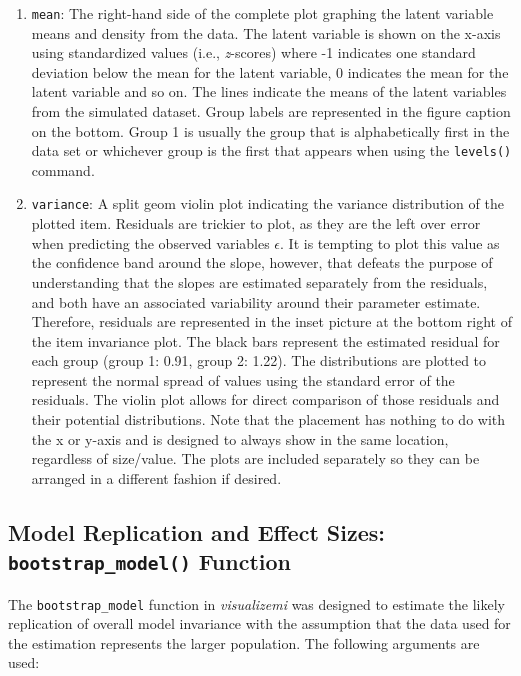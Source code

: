 \documentclass[
  man,floatsintext]{apa7}
\begin{document}
\begin{enumerate}
\def\labelenumi{\arabic{enumi})}
\setcounter{enumi}{2}
\item
  \texttt{mean}: The right-hand side of the complete plot graphing the latent variable means and density from the data. The latent variable is shown on the x-axis using standardized values (i.e., \emph{z}-scores) where -1 indicates one standard deviation below the mean for the latent variable, 0 indicates the mean for the latent variable and so on. The lines indicate the means of the latent variables from the simulated dataset. Group labels are represented in the figure caption on the bottom. Group 1 is usually the group that is alphabetically first in the data set or whichever group is the first that appears when using the \texttt{levels()} command.
\item
  \texttt{variance}: A split geom violin plot indicating the variance distribution of the plotted item. Residuals are trickier to plot, as they are the left over error when predicting the observed variables \(\epsilon\). It is tempting to plot this value as the confidence band around the slope, however, that defeats the purpose of understanding that the slopes are estimated separately from the residuals, and both have an associated variability around their parameter estimate. Therefore, residuals are represented in the inset picture at the bottom right of the item invariance plot. The black bars represent the estimated residual for each group (group 1: 0.91, group 2: 1.22). The distributions are plotted to represent the normal spread of values using the standard error of the residuals. The violin plot allows for direct comparison of those residuals and their potential distributions. Note that the placement has nothing to do with the x or y-axis and is designed to always show in the same location, regardless of size/value. The plots are included separately so they can be arranged in a different fashion if desired.
\end{enumerate}

\newpage

\subsection{\texorpdfstring{Model Replication and Effect Sizes: \texttt{bootstrap\_model()} Function}{Model Replication and Effect Sizes: bootstrap\_model() Function}}\label{model-replication-and-effect-sizes-bootstrap_model-function-1}

The \texttt{bootstrap\_model} function in \emph{visualizemi} was designed to estimate the likely replication of overall model invariance with the assumption that the data used for the estimation represents the larger population. The following arguments are used:
\end{document}
